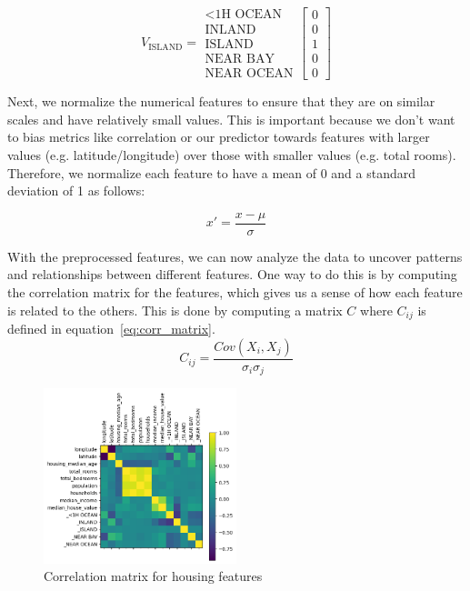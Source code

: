 \documentclass[letterpaper,twocolumn,10pt]{article}
\begin{document}
\begin{equation}
    V_{\text{ISLAND}} = \begin{array}{c}
        \text{<1H OCEAN} \\
        \text{INLAND} \\
        \text{ISLAND} \\
        \text{NEAR BAY} \\
        \text{NEAR OCEAN}
    \end{array}
    \begin{bmatrix}
        0 \\
        0 \\
        1 \\
        0 \\
        0
    \end{bmatrix}
\end{equation}

Next, we normalize the numerical features to ensure that they are on similar scales and have relatively small values.
This is important because we don't want to bias metrics like correlation or our predictor towards features with larger values (e.g. latitude/longitude) over those with smaller values (e.g. total rooms).
Therefore, we normalize each feature to have a mean of 0 and a standard deviation of 1 as follows:

\begin{equation}
    x' = \frac{x - \mu}{\sigma}
\end{equation}

With the preprocessed features, we can now analyze the data to uncover patterns and relationships between different features.
One way to do this is by computing the correlation matrix for the features, which gives us a sense of how each feature is related to the others.
This is done by computing a matrix \(C\) where \(C_{ij}\) is defined in equation~\ref{eq:corr_matrix}.
\begin{equation}
    C_{ij} = \frac{Cov(X_i, X_j)}{\sigma_i \sigma_j} 
    \label{eq:corr_matrix}
\end{equation}

\begin{figure}%
    \centering
    \includegraphics[width=0.5\textwidth]{images/corr_matrix.png}
    \caption{Correlation matrix for housing features}
    \label{fig:correlation_matrix}
\end{figure}
\end{document}
